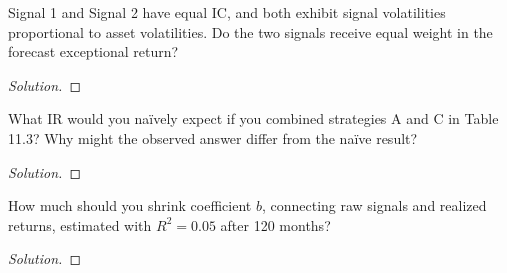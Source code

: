 \begin{problem}{11.1}
  Signal 1 and Signal 2 have equal IC, and both exhibit signal volatilities proportional to asset volatilities. Do the two signals receive equal weight in the forecast exceptional return?
\end{problem}

\begin{proof}[Solution]
\end{proof}

\begin{problem}{11.2}
  What IR would you na\"{i}vely expect if you combined strategies A and C in Table 11.3? Why might the observed answer differ from the na\"{i}ve result?
\end{problem}

\begin{proof}[Solution]
\end{proof}

\begin{problem}{11.3}
  How much should you shrink coefficient $b$, connecting raw signals and realized returns, estimated with $R^{2}=0.05$ after 120 months?
\end{problem}

\begin{proof}[Solution]
\end{proof}